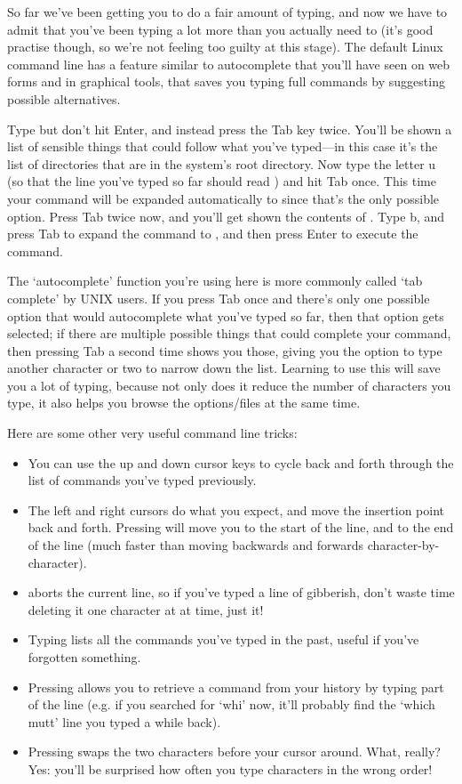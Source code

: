 So far we've been getting you to do a fair amount of typing, and now we have to admit that you've been typing a lot more than you actually need to (it's good practise though, so we're not feeling too guilty at this stage). The default Linux command line has a feature similar to autocomplete that you'll have seen on web forms and in graphical tools, that saves you typing full commands by suggesting possible alternatives. 

Type  but don't hit Enter, and instead press the Tab key twice. You'll be shown a list of sensible things that could follow what you've typed---in this case it's the list of directories that are in the system's root directory. Now type the letter u (so that the line you've typed so far should read ) and hit Tab once. This time your command will be expanded automatically to  since that's the only possible option. Press Tab twice now, and you'll get shown the contents of . Type b, and press Tab to expand the command to , and then press Enter to execute the command.

The `autocomplete' function you're using here is more commonly called `tab complete' by UNIX users. If you press Tab once and there's only one possible option that would autocomplete what you've typed so far, then that option gets selected; if there are multiple possible things that could complete your command, then pressing Tab a second time shows you those, giving you the option to type another character or two to narrow down the list. Learning to use this will save you a lot of typing, because not only does it reduce the number of characters you type, it also helps you browse the options/files at the same time. 

Here are some other very useful command line tricks:

\begin{itemize}
\item You can use the up and down cursor keys to cycle back and forth through the list of commands you've typed previously.
\item The left and right cursors do what you expect, and move the insertion point back and forth. Pressing  will move you to the start of the line, and  to the end of the line (much faster than moving backwards and forwards character-by-character). 
\item {} aborts the current line, so if you've typed a line of gibberish, don't waste time deleting it one character at at time, just  it!
\item Typing  lists all the commands you've typed in the past, useful if you've forgotten something.
\item Pressing  allows you to retrieve a command from your history by typing part of the line (e.g. if you searched for `whi' now, it'll probably find the `which mutt' line you typed a while back). 
\item Pressing  swaps the two characters before your cursor around. What, really? Yes: you'll be surprised how often you type characters in the wrong order! 
\end{itemize}

